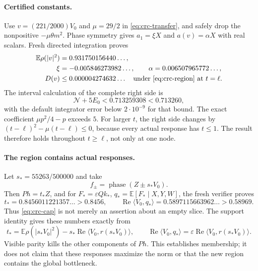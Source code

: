 \paragraph{Certified constants.}
Use $v=(221/2000)V_0$ and $\mu=29/2$ in
\eqref{eq:crc-transfer}, and safely drop the nonpositive $-\mu\theta m^2$.
Phase symmetry gives $a_1=\xi X$ and $a(v)=\alpha X$ with real scalars.
Fresh directed integration proves
\[
\begin{split}
 \mathbb E\rho(|v|^2)&=0.931750156440\ldots,\\
 \xi&=-0.005846273982\ldots,\qquad
 \alpha=0.006507965772\ldots,\\
 D(v)&\le 0.000004274632\ldots\quad\hbox{under \eqref{eq:crc-region} at }t=\ell.
\end{split}
\]
The interval calculation of the complete right side is
\[
 \mathcal N+5E_0 <0.713259308<0.713260,
\]
with the default integrator error below $2\cdot10^{-9}$ for that bound.
The exact coefficient $\mu p^2/4-p$ exceeds $5$.
For larger $t$, the right side changes by
$(t-\ell)^2-\mu(t-\ell)\le0$, because every actual response has $t\le1$.
The result therefore holds throughout $t\ge\ell$, not only at one node.

\paragraph{The region contains actual responses.}
Let $s_*=55263/500000$ and take
\[
 f_\pm=\operatorname{phase}(Z\pm s_*V_0).
\]
Then $Ph=t_*Z$, and for $F_*=\varepsilon Qk_*$,
$q_*=\mathbb E[F_*\mid X,Y,W]$, the fresh verifier proves
\[
 t_*=0.8456011221357\ldots>0.8456,\qquad
 \operatorname{Re}\langle V_0,q_*\rangle
     =0.5897115663962\ldots>0.58969.
\]
Thus \eqref{eq:crc-cap} is not merely an assertion about an empty slice.
The support identity gives these numbers exactly from
\[
 t_* =\mathbb E\rho(|s_*V_0|^2)
       -s_*\operatorname{Re}\langle V_0,r(s_*V_0)\rangle,
 \qquad
 \operatorname{Re}\langle V_0,q_*\rangle
       =\varepsilon\operatorname{Re}\langle V_0,r(s_*V_0)\rangle.
\]
Visible parity kills the other components of $Ph$.
This establishes membership; it does not claim that these responses
maximize the norm or that the new region contains the global bottleneck.

